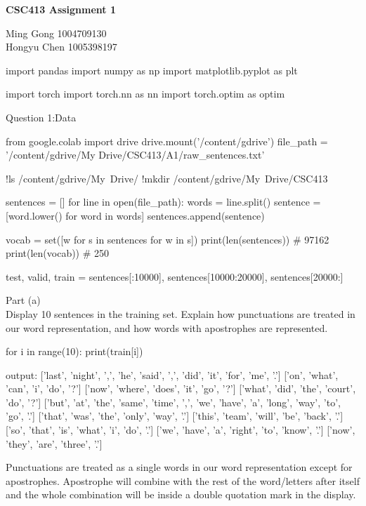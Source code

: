 \documentclass[12pt]{article}
\begin{document}
\begin{center}
\begin{Large}
  \textbf{CSC413 Assignment 1}\\
\end{Large}
\begin{large}
	Ming Gong   1004709130\\
	Hongyu Chen 1005398197
\end{large}
\end{center}

\begin{python}
import pandas
import numpy as np
import matplotlib.pyplot as plt

import torch
import torch.nn as nn
import torch.optim as optim
\end{python}

Question 1:Data\\
\begin{python}
from google.colab import drive
drive.mount('/content/gdrive')
file_path = '/content/gdrive/My Drive/CSC413/A1/raw_sentences.txt'

!ls /content/gdrive/My\ Drive/
!mkdir /content/gdrive/My\ Drive/CSC413

sentences = []
for line in open(file_path):
    words = line.split()
    sentence = [word.lower() for word in words]
    sentences.append(sentence)

vocab = set([w for s in sentences for w in s])
print(len(sentences)) # 97162
print(len(vocab)) # 250

test, valid, train = sentences[:10000], sentences[10000:20000], sentences[20000:]
\end{python}

Part (a) \\
Display 10 sentences in the training set. Explain how punctuations are treated in our word representation, and how words with apostrophes are represented.\\
\begin{python}
for i in range(10):
  print(train[i])
  
output:
['last', 'night', ',', 'he', 'said', ',', 'did', 'it', 'for', 'me', '.']
['on', 'what', 'can', 'i', 'do', '?']
['now', 'where', 'does', 'it', 'go', '?']
['what', 'did', 'the', 'court', 'do', '?']
['but', 'at', 'the', 'same', 'time', ',', 'we', 'have', 'a', 'long', 'way', 'to', 'go', '.']
['that', 'was', 'the', 'only', 'way', '.']
['this', 'team', 'will', 'be', 'back', '.']
['so', 'that', 'is', 'what', 'i', 'do', '.']
['we', 'have', 'a', 'right', 'to', 'know', '.']
['now', 'they', 'are', 'three', '.']
\end{python}
Punctuations are treated as a single words in our word representation except for apostrophes.  Apostrophe will combine with the rest of the word/letters after itself and the whole combination will be inside a double quotation mark in the display.\\
\end{document}
